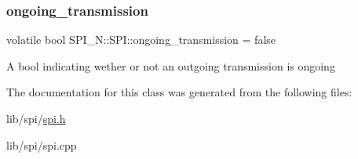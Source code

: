 \subsubsection{\texorpdfstring{ongoing\+\_\+transmission}{ongoing\_transmission}}
{\footnotesize\ttfamily volatile bool S\+P\+I\+\_\+\+N\+::\+S\+P\+I\+::ongoing\+\_\+transmission = false\hspace{0.3cm}{\ttfamily [private]}}

A bool indicating wether or not an outgoing transmission is ongoing 

The documentation for this class was generated from the following files\+:\begin{DoxyCompactItemize}
\item 
lib/spi/\hyperlink{spi_8h}{spi.\+h}\item 
lib/spi/spi.\+cpp\end{DoxyCompactItemize}

